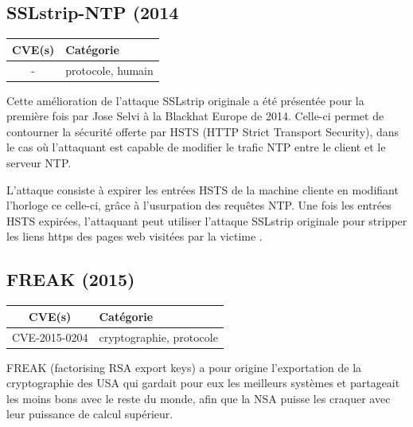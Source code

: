 \subsection{SSLstrip-NTP (2014}

\begin{tabularx}{0.96\textwidth}{|c|X|}
  \hline
  \textbf{CVE(s)} & \textbf{Catégorie} \\
  \hline
  - & protocole, humain \\
  \hline
\end{tabularx}

\vspace{1em}

Cette amélioration de l'attaque SSLstrip originale a été présentée pour la première fois par Jose Selvi à la Blackhat Europe de 2014. Celle-ci permet de contourner la sécurité offerte par HSTS (HTTP Strict Transport Security), dans le cas où l'attaquant est capable de modifier le trafic NTP entre le client et le serveur NTP.

L'attaque consiste à expirer les entrées HSTS de la machine cliente en modifiant l'horloge ce celle-ci, grâce à l'usurpation des requêtes NTP. Une fois les entrées HSTS expirées, l'attaquant peut utiliser l'attaque SSLstrip originale pour stripper les liens https des pages web visitées par la victime \cite{sslstrip-ntp}.


\subsection{FREAK (2015)}

\begin{tabularx}{0.96\textwidth}{|c|X|}
  \hline
  \textbf{CVE(s)} & \textbf{Catégorie} \\
  \hline
  CVE-2015-0204 & cryptographie, protocole \\
  \hline
\end{tabularx}

\vspace{1em}

FREAK (factorising RSA export keys) a pour origine l'exportation de la cryptographie des USA qui gardait pour eux les meilleurs systèmes et partageait les moins bons avec le reste du monde, afin que la NSA puisse les craquer avec leur puissance de calcul supérieur.

